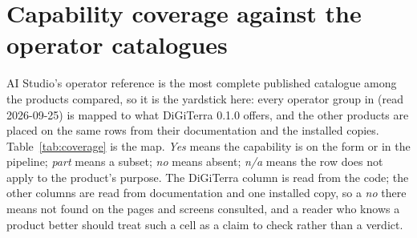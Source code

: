 \section{Capability coverage against the operator catalogues}
\label{sec:coverage}

AI Studio's operator reference is the most complete published catalogue among the products compared, so it is the yardstick here: every operator group in  (read 2026-09-25) is mapped to what DiGiTerra 0.1.0 offers, and the other products are placed on the same rows from their documentation and the installed copies. Table~\ref{tab:coverage} is the map. \emph{Yes} means the capability is on the form or in the pipeline; \emph{part} means a subset; \emph{no} means absent; \emph{n/a} means the row does not apply to the product's purpose. The DiGiTerra column is read from the code; the other columns are read from documentation and one installed copy, so a \emph{no} there means not found on the pages and screens consulted, and a reader who knows a product better should treat such a cell as a claim to check rather than a verdict.

